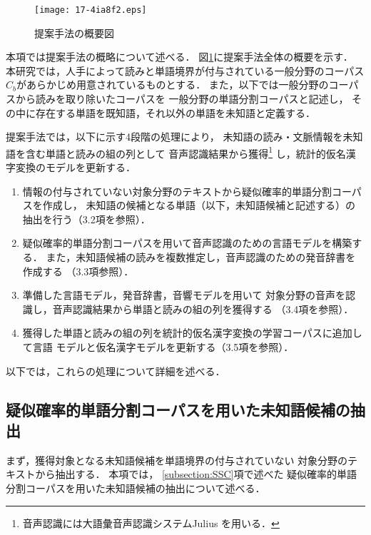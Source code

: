 \documentclass[japanese]{jnlp_1.4}
\begin{document}
\begin{figure}[b]
  \begin{center}
\texttt{[image: 17-4ia8f2.eps]}
  \end{center}
  \caption{提案手法の概要図}
  \label{figure_sect4_overview}
\end{figure}

本項では提案手法の概略について述べる．
図\ref{figure_sect4_overview}に提案手法全体の概要を示す．
本研究では，人手によって読みと単語境界が付与されている一般分野のコーパス
$C_b$があらかじめ用意されているものとする．
また，以下では一般分野のコーパスから読みを取り除いたコーパスを
一般分野の単語分割コーパスと記述し，
その中に存在する単語を既知語，それ以外の単語を未知語と定義する．

提案手法では，以下に示す4段階の処理により，
未知語の読み・文脈情報を未知語を含む単語と読みの組の列として
音声認識結果から獲得\footnote{
音声認識には大語彙音声認識システムJulius
\cite{Julius.--.An.Open.Source.Real-Time.Large.Vocabulary.Recognition.Engine}
を用いる．}
し，統計的仮名漢字変換のモデルを更新する．
\begin{enumerate}
 \item 情報の付与されていない対象分野のテキストから疑似確率的単語分割コーパスを作成し，
       未知語の候補となる単語（以下，未知語候補と記述する）の抽出を行う（3.2項を参照）．
 \item 疑似確率的単語分割コーパスを用いて音声認識のための言語モデルを構築する．
       また，未知語候補の読みを複数推定し，音声認識のための発音辞書を作成する
       （3.3項参照）．
 \item 準備した言語モデル，発音辞書，音響モデルを用いて
       対象分野の音声を認識し，音声認識結果から単語と読みの組の列を獲得する
       （3.4項を参照）．
 \item 獲得した単語と読みの組の列を統計的仮名漢字変換の学習コーパスに追加して言語
       モデルと仮名漢字モデルを更新する（3.5項を参照）．
\end{enumerate}
以下では，これらの処理について詳細を述べる．


\subsection{疑似確率的単語分割コーパスを用いた未知語候補の抽出}
\label{subsect:ext_unk}

まず，獲得対象となる未知語候補を単語境界の付与されていない
対象分野のテキストから抽出する．
本項では，
\ref{subsection:SSC}項で述べた
疑似確率的単語分割コーパスを用いた未知語候補の抽出について述べる．
\end{document}
